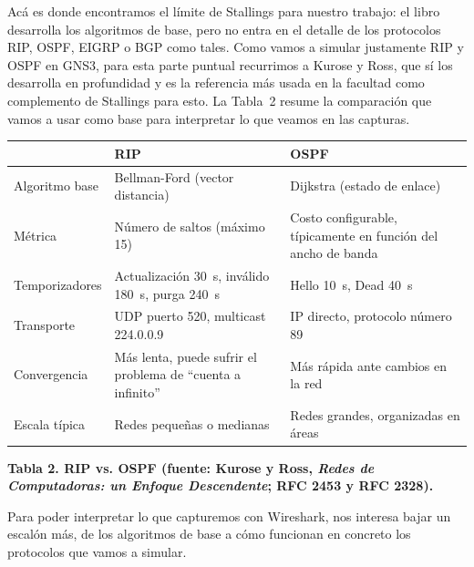 \documentclass[11pt,a4paper]{article}
\newcommand{\figcaption}[1]{\par\noindent\footnotesize\textbf{#1}\par\vspace{0.4cm}}
\begin{document}
Ac\'a es donde encontramos el l\'imite de Stallings para nuestro trabajo: el libro desarrolla los algoritmos de base, pero no entra en el detalle de los protocolos RIP, OSPF, EIGRP o BGP como tales. Como vamos a simular justamente RIP y OSPF en GNS3, para esta parte puntual recurrimos a Kurose y Ross, que s\'i los desarrolla en profundidad y es la referencia m\'as usada en la facultad como complemento de Stallings para esto. La Tabla~2 resume la comparaci\'on que vamos a usar como base para interpretar lo que veamos en las capturas.

\needspace{1cm}
\begin{center}
\begin{minipage}{0.96\linewidth}
\centering
\small
\begin{tabular}{@{}p{2.6cm}p{5.6cm}p{5.6cm}@{}}
\toprule
 & \textbf{RIP} & \textbf{OSPF} \\
\midrule
Algoritmo base & Bellman-Ford (vector distancia) & Dijkstra (estado de enlace) \\
M\'etrica & N\'umero de saltos (m\'aximo 15) & Costo configurable, t\'ipicamente en funci\'on del ancho de banda \\
Temporizadores & Actualizaci\'on 30~s, inv\'alido 180~s, purga 240~s & Hello 10~s, Dead 40~s \\
Transporte & UDP puerto 520, multicast 224.0.0.9 & IP directo, protocolo n\'umero 89 \\
Convergencia & M\'as lenta, puede sufrir el problema de ``cuenta a infinito'' & M\'as r\'apida ante cambios en la red \\
Escala t\'ipica & Redes peque\~nas o medianas & Redes grandes, organizadas en \'areas \\
\bottomrule
\end{tabular}
\par\vspace{0.1cm}
\figcaption{Tabla 2. RIP vs. OSPF (fuente: Kurose y Ross, \textit{Redes de Computadoras: un Enfoque Descendente}; RFC 2453 y RFC 2328).}
\end{minipage}
\end{center}

Para poder interpretar lo que capturemos con Wireshark, nos interesa bajar un escal\'on m\'as, de los algoritmos de base a c\'omo funcionan en concreto los protocolos que vamos a simular.
\end{document}
